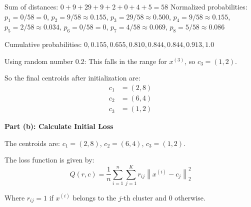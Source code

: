 Sum of distances: $0 + 9 + 29 + 9 + 2 + 0 + 4 + 5 = 58$
Normalized probabilities:
$p_1 = 0/58 = 0$, $p_2 = 9/58 \approx 0.155$, $p_3 = 29/58 \approx 0.500$, $p_4 = 9/58 \approx 0.155$,
$p_5 = 2/58 \approx 0.034$, $p_6 = 0/58 = 0$, $p_7 = 4/58 \approx 0.069$, $p_8 = 5/58 \approx 0.086$

Cumulative probabilities: $0, 0.155, 0.655, 0.810, 0.844, 0.844, 0.913, 1.0$

Using random number 0.2: This falls in the range for $x^{(3)}$, so $c_3 = (1,2)$.

So the final centroids after initialization are:
\begin{align*}
c_1 &= (2,8) \\
c_2 &= (6,4) \\
c_3 &= (1,2)
\end{align*}



\textbf{Part (b): Calculate Initial Loss}

The centroids are:
$c_1 = (2,8)$, $c_2 = (6,4)$, $c_3 = (1,2)$.

The loss function is given by:
$$Q(r,c) = \dfrac{1}{n} \sum_{i=1}^n \sum_{j=1}^K r_{ij}\left\|x^{(i)} - c_j\right\|_2^2$$

Where $r_{ij} = 1$ if $x^{(i)}$ belongs to the $j$-th cluster and 0 otherwise.

